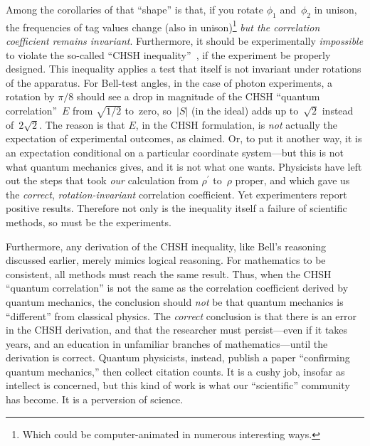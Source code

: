 \documentclass[9pt,technote]{IEEEtran}
\begin{document}
Among the corollaries of that ``shape'' is that, if you rotate
$\phi_1$ and~$\phi_2$ in unison, the frequencies of tag values change
(also in unison)\footnote{Which could be computer-animated in numerous
  interesting ways.} {\em{but the correlation coefficient remains
    invariant}}. Furthermore, it should be experimentally
{\em{impossible}} to violate the so-called ``CHSH
inequality''~\cite{enwiki:1170465048}, if the experiment be properly
designed. This inequality applies a test that itself is not invariant
under rotations of the apparatus. For Bell-test angles, in the case of
photon experiments, a rotation by $\pi\!/8$ should see a drop in
magnitude of the CHSH ``quantum correlation''~$E$ from $\sqrt{1\!/2}$
to~zero, so~$|S|$ (in the ideal) adds up to~$\sqrt2$ instead
of~$2\sqrt2$. The reason is that $E$, in the CHSH formulation, is
{\em{not}} actually the expectation of experimental outcomes, as
claimed. Or, to put it another way, it is an expectation conditional
on a particular coordinate system---but this is not what quantum
mechanics gives, and it is not what one wants. Physicists have left
out the steps that took {\em{our}} calculation from $\rho^{\prime}$
to~$\rho$ proper, and which gave us the {\em{correct}},
{\em{rotation-invariant}} correlation coefficient. Yet experimenters
report positive results. Therefore not only is the inequality itself a
failure of scientific methods, so must be the experiments.

Furthermore, any derivation of the CHSH inequality, like Bell's
reasoning discussed earlier, merely mimics logical reasoning. For
mathematics to be consistent, all methods must reach the same
result. Thus, when the CHSH ``quantum correlation'' is not the same as
the correlation coefficient derived by quantum mechanics, the
conclusion should {\em{not}} be that quantum mechanics is
``different'' from classical physics. The {\em{correct}} conclusion is
that there is an error in the CHSH derivation, and that the researcher
must persist---even if it takes years, and an education in unfamiliar
branches of mathematics---until the derivation is correct. Quantum
physicists, instead, publish a paper ``confirming quantum mechanics,''
then collect citation counts. It is a cushy job, insofar as intellect
is concerned, but this kind of work is what our ``scientific''
community has become. It is a perversion of science.
\end{document}
